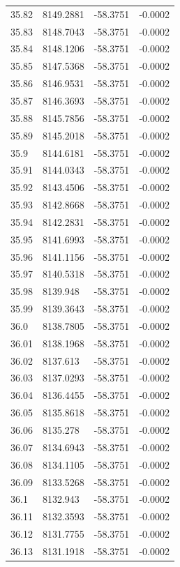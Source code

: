 \begin{table}[H]
\begin{tabular}{llll}
35.82 & 8149.2881 & -58.3751 & -0.0002 \\
35.83 & 8148.7043 & -58.3751 & -0.0002 \\
35.84 & 8148.1206 & -58.3751 & -0.0002 \\
35.85 & 8147.5368 & -58.3751 & -0.0002 \\
35.86 & 8146.9531 & -58.3751 & -0.0002 \\
35.87 & 8146.3693 & -58.3751 & -0.0002 \\
35.88 & 8145.7856 & -58.3751 & -0.0002 \\
35.89 & 8145.2018 & -58.3751 & -0.0002 \\
35.9 & 8144.6181 & -58.3751 & -0.0002 \\
35.91 & 8144.0343 & -58.3751 & -0.0002 \\
35.92 & 8143.4506 & -58.3751 & -0.0002 \\
35.93 & 8142.8668 & -58.3751 & -0.0002 \\
35.94 & 8142.2831 & -58.3751 & -0.0002 \\
35.95 & 8141.6993 & -58.3751 & -0.0002 \\
35.96 & 8141.1156 & -58.3751 & -0.0002 \\
35.97 & 8140.5318 & -58.3751 & -0.0002 \\
35.98 & 8139.948 & -58.3751 & -0.0002 \\
35.99 & 8139.3643 & -58.3751 & -0.0002 \\
36.0 & 8138.7805 & -58.3751 & -0.0002 \\
36.01 & 8138.1968 & -58.3751 & -0.0002 \\
36.02 & 8137.613 & -58.3751 & -0.0002 \\
36.03 & 8137.0293 & -58.3751 & -0.0002 \\
36.04 & 8136.4455 & -58.3751 & -0.0002 \\
36.05 & 8135.8618 & -58.3751 & -0.0002 \\
36.06 & 8135.278 & -58.3751 & -0.0002 \\
36.07 & 8134.6943 & -58.3751 & -0.0002 \\
36.08 & 8134.1105 & -58.3751 & -0.0002 \\
36.09 & 8133.5268 & -58.3751 & -0.0002 \\
36.1 & 8132.943 & -58.3751 & -0.0002 \\
36.11 & 8132.3593 & -58.3751 & -0.0002 \\
36.12 & 8131.7755 & -58.3751 & -0.0002 \\
36.13 & 8131.1918 & -58.3751 & -0.0002 \\

\end{tabular}
\end{table}
